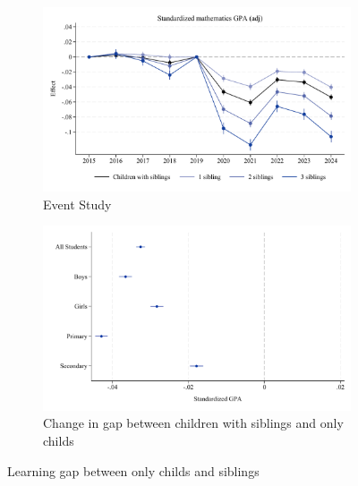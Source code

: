 \begin{figure}[htbp]
    \centering
    
    \begin{subfigure}{\textwidth}
        \centering
        \includegraphics[width=\textwidth]{./FIGURES/Event Study/covid_std_gpa_m_adj_all_all_all_elm_all.pdf}
        \caption{Event Study}
        \label{fig:1a}
    \end{subfigure}
    
    \vspace{1em} %
    
    \begin{subfigure}{\textwidth}
        \centering
        \includegraphics[width=\textwidth]{./FIGURES/TWFE/covid_twfe_B_all_all_gpa_m_adj_4.pdf}
        \caption{Change in gap between children with siblings and only childs}
        \label{fig:1b}
    \end{subfigure}
    
    \caption{Learning gap between only childs and siblings}
    \label{fig:combined}
\end{figure}


\clearpage
















